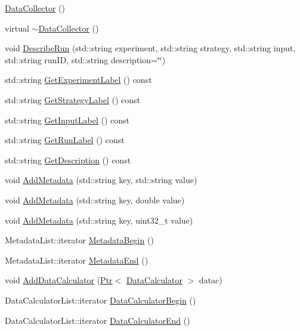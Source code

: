 \begin{DoxyCompactItemize}
\item 
\hyperlink{classns3_1_1DataCollector_a6f7eccfdf026a83317c386a18d16397d}{Data\+Collector} ()
\item 
virtual \hyperlink{classns3_1_1DataCollector_a9f9ff1817bd0601ba33925c3378ac50e}{$\sim$\+Data\+Collector} ()
\item 
void \hyperlink{classns3_1_1DataCollector_acbe01ba4bbd08201837d89f4d9f70c8d}{Describe\+Run} (std\+::string experiment, std\+::string strategy, std\+::string input, std\+::string run\+ID, std\+::string description=\char`\"{}\char`\"{})
\item 
std\+::string \hyperlink{classns3_1_1DataCollector_af62040c154454a67ada1c1b151e1e739}{Get\+Experiment\+Label} () const 
\item 
std\+::string \hyperlink{classns3_1_1DataCollector_a96b68e2cf2f1a1177b280e898fa7d169}{Get\+Strategy\+Label} () const 
\item 
std\+::string \hyperlink{classns3_1_1DataCollector_a9a1807ddc67f99a76709e9a4107887d7}{Get\+Input\+Label} () const 
\item 
std\+::string \hyperlink{classns3_1_1DataCollector_aa3b3c26378c4e1dc0954821a933be305}{Get\+Run\+Label} () const 
\item 
std\+::string \hyperlink{classns3_1_1DataCollector_a64c22768dc317f616458608d9e1a6b4c}{Get\+Description} () const 
\item 
void \hyperlink{classns3_1_1DataCollector_a52ea3f8c1b9d3fd92c459ffcea370910}{Add\+Metadata} (std\+::string key, std\+::string value)
\item 
void \hyperlink{classns3_1_1DataCollector_a04048563bd32516721e62ab212028253}{Add\+Metadata} (std\+::string key, double value)
\item 
void \hyperlink{classns3_1_1DataCollector_abff7c3cbad312e0b52679000644c78a3}{Add\+Metadata} (std\+::string key, uint32\+\_\+t value)
\item 
Metadata\+List\+::iterator \hyperlink{classns3_1_1DataCollector_a46dcf81704797c44d7194e7f14b43452}{Metadata\+Begin} ()
\item 
Metadata\+List\+::iterator \hyperlink{classns3_1_1DataCollector_a49eac13159763a8ef234677e76afc708}{Metadata\+End} ()
\item 
void \hyperlink{classns3_1_1DataCollector_a7d9c1b1156293636bc600dc4b8e7b602}{Add\+Data\+Calculator} (\hyperlink{classns3_1_1Ptr}{Ptr}$<$ \hyperlink{classns3_1_1DataCalculator}{Data\+Calculator} $>$ datac)
\item 
Data\+Calculator\+List\+::iterator \hyperlink{classns3_1_1DataCollector_a22716600bb9685d1da74ddef53355e6f}{Data\+Calculator\+Begin} ()
\item 
Data\+Calculator\+List\+::iterator \hyperlink{classns3_1_1DataCollector_a26e656c86a375228ae49645c387ad201}{Data\+Calculator\+End} ()
\end{DoxyCompactItemize}
